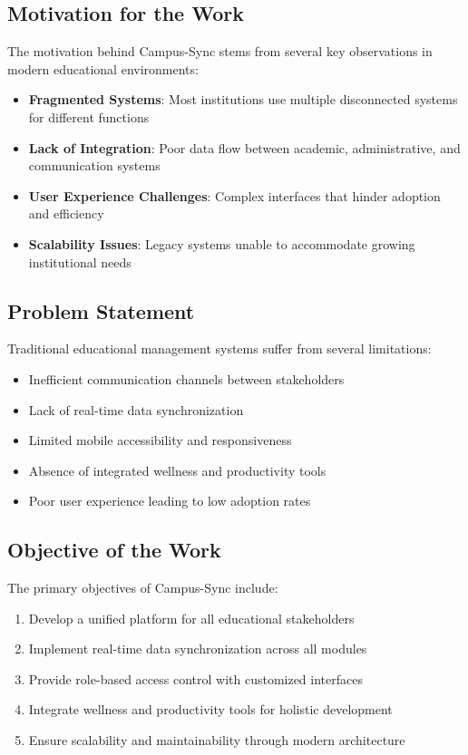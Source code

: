 \subsection{Motivation for the Work}
The motivation behind Campus-Sync stems from several key observations in modern educational environments:
\begin{itemize}
\item \textbf{Fragmented Systems}: Most institutions use multiple disconnected systems for different functions
\item \textbf{Lack of Integration}: Poor data flow between academic, administrative, and communication systems
\item \textbf{User Experience Challenges}: Complex interfaces that hinder adoption and efficiency
\item \textbf{Scalability Issues}: Legacy systems unable to accommodate growing institutional needs
\end{itemize}

\subsection{Problem Statement}
Traditional educational management systems suffer from several limitations:
\begin{itemize}
\item Inefficient communication channels between stakeholders
\item Lack of real-time data synchronization
\item Limited mobile accessibility and responsiveness
\item Absence of integrated wellness and productivity tools
\item Poor user experience leading to low adoption rates
\end{itemize}

\subsection{Objective of the Work}
The primary objectives of Campus-Sync include:
\begin{enumerate}
\item Develop a unified platform for all educational stakeholders
\item Implement real-time data synchronization across all modules
\item Provide role-based access control with customized interfaces
\item Integrate wellness and productivity tools for holistic development
\item Ensure scalability and maintainability through modern architecture
\end{enumerate}

